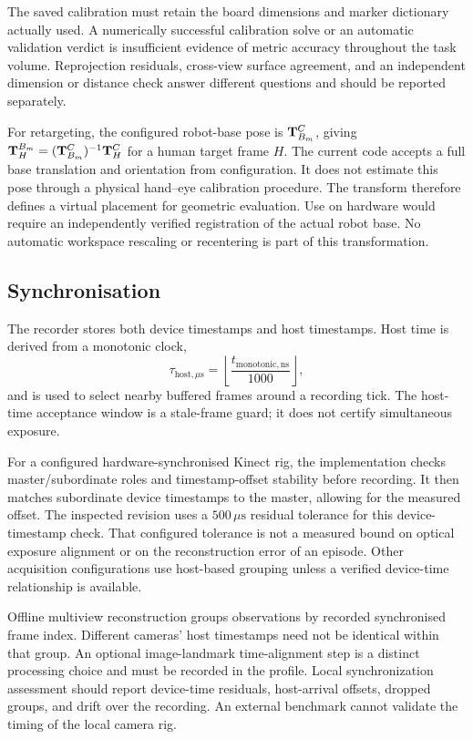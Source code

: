 The saved calibration must retain the board dimensions and marker
dictionary actually used. A numerically successful calibration solve or
an automatic validation verdict is insufficient evidence of metric
accuracy throughout the task volume. Reprojection residuals, cross-view
surface agreement, and an independent dimension or distance check answer
different questions and should be reported separately.

For retargeting, the configured robot-base pose is $\mathbf{T}^C_{B_m}$, giving
$\mathbf{T}^{B_m}_H=(\mathbf{T}^C_{B_m})^{-1}\mathbf{T}^C_H$ for a human target frame $H$.
The current code accepts a full base translation and orientation from
configuration. It does not estimate this pose through a physical hand--eye
calibration procedure. The transform therefore defines a virtual placement
for geometric evaluation. Use on hardware would require an independently
verified registration of the actual robot base. No automatic workspace
rescaling or recentering is part of this transformation.

\subsection{Synchronisation}
\label{sec:sync}

The recorder stores both device timestamps and host timestamps. Host time
is derived from a monotonic clock,
\begin{equation}
  \tau_{\mathrm{host},\mu\mathrm{s}}
    = \left\lfloor\frac{t_{\mathrm{monotonic},\mathrm{ns}}}{1000}\right\rfloor,
  \label{eq:hostclock}
\end{equation}
and is used to select nearby buffered frames around a recording tick.
The host-time acceptance window is a stale-frame guard; it does not certify
simultaneous exposure.

For a configured hardware-synchronised Kinect rig, the implementation
checks master/subordinate roles and timestamp-offset stability before
recording. It then matches subordinate device timestamps to the master,
allowing for the measured offset. The inspected revision uses a
$500\,\mu\mathrm{s}$ residual tolerance for this device-timestamp check.
That configured tolerance is not a measured bound on optical exposure
alignment or on the reconstruction error of an episode. Other acquisition
configurations use host-based grouping unless a verified device-time
relationship is available.

Offline multiview reconstruction groups observations by recorded
synchronised frame index. Different cameras' host timestamps need not be
identical within that group. An optional image-landmark time-alignment
step is a distinct processing choice and must be recorded in the profile.
Local synchronization assessment should report device-time residuals,
host-arrival offsets, dropped groups, and drift over the recording. An
external benchmark cannot validate the timing of the local camera rig.

